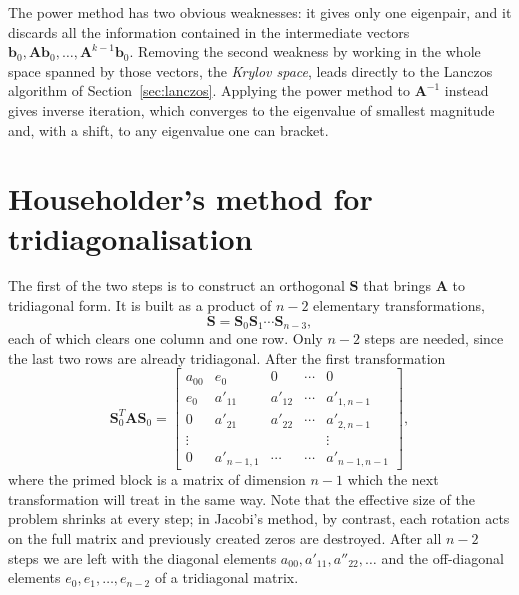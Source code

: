The power method has two obvious weaknesses: it gives only one eigenpair, and
it discards all the information contained in the intermediate vectors
$\bm{b}_0,\bm{A}\bm{b}_0,\dots,\bm{A}^{k-1}\bm{b}_0$.  Removing the second
weakness by working in the whole space spanned by those vectors, the
\emph{Krylov space}, leads directly to the Lanczos algorithm of
Section~\ref{sec:lanczos}.  Applying the power method to $\bm{A}^{-1}$ instead
gives inverse iteration, which converges to the eigenvalue of smallest
magnitude and, with a shift, to any eigenvalue one can bracket.

\section{Householder's method for tridiagonalisation}
\label{sec:householder}

The first of the two steps is to construct an orthogonal $\bm{S}$ that brings
$\bm{A}$ to tridiagonal form.  It is built as a product of $n-2$ elementary
transformations,
\begin{equation}
  \bm{S} = \bm{S}_0\bm{S}_1\cdots\bm{S}_{n-3},
  \label{eq:1-householderprod}
\end{equation}
each of which clears one column and one row.  Only $n-2$ steps are needed,
since the last two rows are already tridiagonal.  After the first
transformation
\begin{equation}
  \bm{S}_0^{T}\bm{A}\bm{S}_0 =
  \begin{bmatrix}
    a_{00} & e_0 & 0 & \cdots & 0\\
    e_0    & a'_{11} & a'_{12} & \cdots & a'_{1,n-1}\\
    0      & a'_{21} & a'_{22} & \cdots & a'_{2,n-1}\\
    \vdots &  &  & &\vdots\\
    0      & a'_{n-1,1} & \cdots & \cdots & a'_{n-1,n-1}
  \end{bmatrix},
  \label{eq:1-afterfirst}
\end{equation}
where the primed block is a matrix of dimension $n-1$ which the next
transformation will treat in the same way.  Note that the effective size of
the problem shrinks at every step; in Jacobi's method, by contrast, each
rotation acts on the full matrix and previously created zeros are destroyed.
After all $n-2$ steps we are left with the diagonal elements
$a_{00},a'_{11},a''_{22},\dots$ and the off-diagonal elements
$e_0,e_1,\dots,e_{n-2}$ of a tridiagonal matrix.

